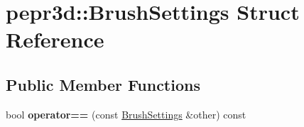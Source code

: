 \hypertarget{structpepr3d_1_1_brush_settings}{}\section{pepr3d\+::Brush\+Settings Struct Reference}
\label{structpepr3d_1_1_brush_settings}
\subsection*{Public Member Functions}
\begin{DoxyCompactItemize}
\item 
\mbox{\label{structpepr3d_1_1_brush_settings_a8ad6fcd04c952660c50cf80bcf9db233}} 
bool {\bfseries operator==} (const \mbox{\hyperlink{structpepr3d_1_1_brush_settings}{Brush\+Settings}} \&other) const
\end{DoxyCompactItemize}
